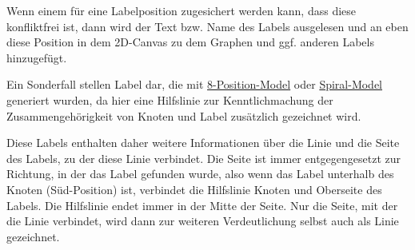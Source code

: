 
Wenn einem für eine Labelposition zugesichert werden kann, dass diese konfliktfrei ist,
dann wird der Text bzw. Name des Labels ausgelesen und an eben diese Position in dem 2D-Canvas zu dem Graphen und ggf. anderen Labels hinzugefügt.

Ein Sonderfall stellen Label dar, die mit \hyperref[subsubsec:8pos]{8-Position-Model} oder \hyperref[subsubsec:spiral]{Spiral-Model} generiert wurden,
da hier eine Hilfslinie zur Kenntlichmachung der Zusammengehörigkeit von Knoten und Label zusätzlich gezeichnet wird.

Diese Labels enthalten daher weitere Informationen über die Linie und die Seite des Labels, zu der diese Linie verbindet.
Die Seite ist immer entgegengesetzt zur Richtung, in der das Label gefunden wurde, also wenn das Label unterhalb des Knoten (Süd-Position) ist, verbindet die Hilfslinie Knoten und Oberseite des Labels.
Die Hilfslinie endet immer in der Mitte der Seite.
Nur die Seite, mit der die Linie verbindet, wird dann zur weiteren Verdeutlichung selbst auch als Linie gezeichnet.